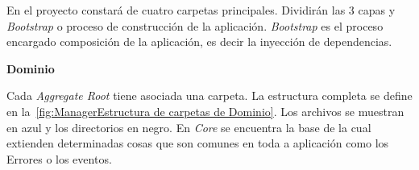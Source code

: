 En el proyecto constará de cuatro carpetas principales.
Dividirán las 3 capas y \textit{Bootstrap} o proceso de construcción de la aplicación.
\textit{Bootstrap} es el proceso encargado composición de la aplicación, es decir la inyección de dependencias.


\textbf{Dominio}

Cada \textit{Aggregate Root} tiene asociada una carpeta.
La estructura completa se define en la~\cref{fig:ManagerEstructura de carpetas de Dominio}.
Los archivos se muestran en azul y los directorios en negro.
En \textit{Core} se encuentra la base de la cual extienden determinadas cosas que son comunes en toda a aplicación como los Errores o los eventos.

